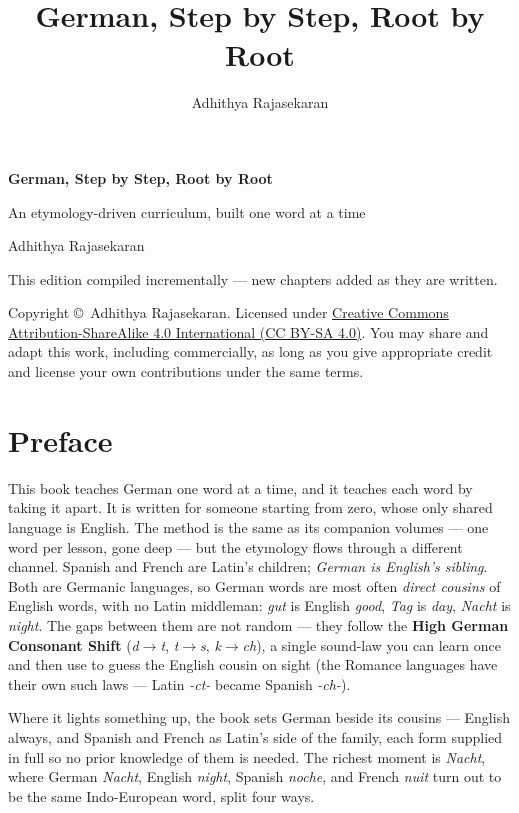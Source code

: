 \documentclass[11pt,twoside]{book}
\title{\Huge German, Step by Step, Root by Root}
\author{Adhithya Rajasekaran}
\date{}
\begin{document}
\frontmatter

\begin{titlepage}
  \centering
  \vspace*{3cm}
  {\Huge\bfseries German, Step by Step, Root by Root\par}
  \vspace{1cm}
  {\Large An etymology-driven curriculum, built one word at a time\par}
  \vspace{1.5cm}
  {\large Adhithya Rajasekaran\par}
  \vfill
  {\large This edition compiled incrementally --- new chapters added as they
  are written.\par}
  \vspace{2cm}
  {\normalsize
    Copyright \copyright\ Adhithya Rajasekaran. Licensed under
    \href{https://creativecommons.org/licenses/by-sa/4.0/}%
    {Creative Commons Attribution-ShareAlike 4.0 International (CC BY-SA 4.0)}.
    You may share and adapt this work, including commercially, as long as
    you give appropriate credit and license your own contributions under
    the same terms.\par
  }
\end{titlepage}

\chapter*{Preface}

This book teaches German one word at a time, and it teaches each word by taking
it apart. It is written for someone starting from zero, whose only shared
language is English. The method is the same as its companion volumes --- one
word per lesson, gone deep --- but the etymology flows through a different
channel. Spanish and French are Latin's children; \emph{German is
English's sibling}. Both are Germanic languages, so German words are most often
\emph{direct cousins} of English words, with no Latin middleman: \emph{gut} is
English \emph{good}, \emph{Tag} is \emph{day}, \emph{Nacht} is \emph{night}.
The gaps between them are not random --- they follow the \textbf{High German
Consonant Shift} (\emph{d}$\to$\emph{t}, \emph{t}$\to$\emph{s},
\emph{k}$\to$\emph{ch}), a single sound-law you can learn once and then use to
guess the English cousin on sight (the Romance languages have their own such
laws --- Latin \emph{-ct-} became Spanish \emph{-ch-}).

Where it lights something up, the book sets German beside its cousins ---
English always, and Spanish and French as Latin's side of the family, each form
supplied in full so no prior knowledge of them is needed. The richest moment is
\emph{Nacht}, where German \emph{Nacht}, English \emph{night}, Spanish
\emph{noche}, and French \emph{nuit} turn out to be the same Indo-European
word, split four ways.
\end{document}
